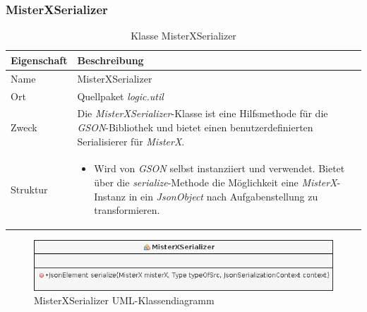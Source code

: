     \subsubsection{MisterXSerializer}
        \begin{table}[H]
            \caption{Klasse MisterXSerializer}
            \begin{tabular}{p{2.5cm}  p{9.5cm}} 
                \hline
                \textbf{Eigenschaft} & \textbf{Beschreibung}\\
                \hline
                Name & MisterXSerializer\\
                Ort & Quellpaket \textit{logic.util}\\
                \hline
                Zweck &
                Die \textit{MisterXSerializer}-Klasse ist eine Hilfsmethode für die \textit{GSON}-Bibliothek
                und bietet einen benutzerdefinierten Serialisierer für \textit{MisterX}.
                \\
                \hline
                Struktur &
                \begin{itemize}
                    \itemsep0em
                    \item Wird von \textit{GSON} selbst instanziiert und verwendet.
                    Bietet über die \textit{serialize}-Methode die Möglichkeit eine \textit{MisterX}-Instanz in ein \textit{JsonObject}
                    nach Aufgabenstellung zu transformieren.
                \end{itemize}
                \\
                \hline
            \end{tabular}
        \end{table}
        \begin{figure}[H]
            \centering
            \includegraphics[scale=0.6]{img/uml/misterXSerializer.png}   
            \caption{MisterXSerializer UML-Klassendiagramm}
        \end{figure}


